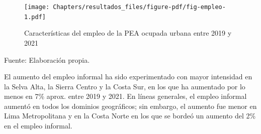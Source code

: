 \documentclass[
  letterpaper,
  12pt,
  oneside,
  spanish,
  doublespacing,
  headsepline,
  parskip]{MastersDoctoralThesis}
\begin{document}
\break

\begin{figure}

\caption{\label{fig-empleo}Características del empleo de la PEA ocupada
urbana entre 2019 y 2021}

{\centering \texttt{[image: Chapters/resultados\_files/figure-pdf/fig-empleo-1.pdf]}

}

\end{figure}

\noindent \small Fuente: Elaboración propia. \normalsize

El aumento del empleo informal ha sido experimentado con mayor
intensidad en la Selva Alta, la Sierra Centro y la Costa Sur, en los que
ha aumentado por lo menos en 7\% aprox. entre 2019 y 2021. En líneas
generales, el empleo informal aumentó en todos los dominios geográficos;
sin embargo, el aumento fue menor en Lima Metropolitana y en la Costa
Norte en los que se bordeó un aumento del 2\% en el empleo informal.
\end{document}
